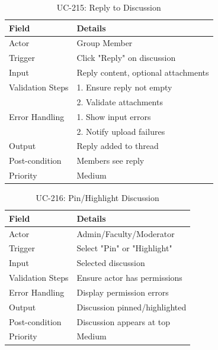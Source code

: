 \begin{table}[H]
\centering
\caption{UC-215: Reply to Discussion}
\begin{tabular}{|l|p{10cm}|}
\hline
\textbf{Field} & \textbf{Details} \\ \hline
Actor & Group Member \\ \hline
Trigger & Click "Reply" on discussion \\ \hline
Input & Reply content, optional attachments \\ \hline
Validation Steps & 1. Ensure reply not empty \\ 
                 & 2. Validate attachments \\ \hline
Error Handling & 1. Show input errors \\ 
               & 2. Notify upload failures \\ \hline
Output & Reply added to thread \\ \hline
Post-condition & Members see reply \\ \hline
Priority & Medium \\ \hline
\end{tabular}
\end{table}

\begin{table}[H]
\centering
\caption{UC-216: Pin/Highlight Discussion}
\begin{tabular}{|l|p{10cm}|}
\hline
\textbf{Field} & \textbf{Details} \\ \hline
Actor & Admin/Faculty/Moderator \\ \hline
Trigger & Select "Pin" or "Highlight" \\ \hline
Input & Selected discussion \\ \hline
Validation Steps & Ensure actor has permissions \\ \hline
Error Handling & Display permission errors \\ \hline
Output & Discussion pinned/highlighted \\ \hline
Post-condition & Discussion appears at top \\ \hline
Priority & Medium \\ \hline
\end{tabular}
\end{table}

